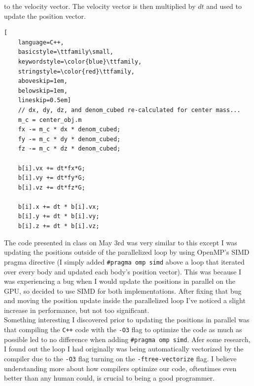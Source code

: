 to the velocity vector. The velocity vector is then multiplied by $dt$ and used to update the position vector.
\begin{lstlisting}[
    language=C++,
    basicstyle=\ttfamily\small,
    keywordstyle=\color{blue}\ttfamily,
    stringstyle=\color{red}\ttfamily,
    aboveskip=1em,
    belowskip=1em,
    lineskip=0.5em]
    // dx, dy, dz, and denom_cubed re-calculated for center mass...
    m_c = center_obj.m
    fx -= m_c * dx * denom_cubed; 
    fy -= m_c * dy * denom_cubed; 
    fz -= m_c * dz * denom_cubed;

    b[i].vx += dt*fx*G;
    b[i].vy += dt*fy*G;
    b[i].vz += dt*fz*G;

    b[i].x += dt * b[i].vx;
    b[i].y += dt * b[i].vy;
    b[i].z += dt * b[i].vz;
\end{lstlisting}
\indent The code presented in class on May 3rd was very similar to this except I was updating the positions outside of the 
parallelized loop by using OpenMP's SIMD pragma directive (I simply added \verb|#pragma omp simd| above a 
loop that iterated over every body and updated each body's position vector). This was because I was experiencing a bug 
when I would update the positions in parallel on the GPU, so decided to use SIMD for both implementations. After fixing that bug 
and moving the position update inside the parallelized loop
I've noticed a slight increase in performance, but not too significant. \\
\indent Something interesting I discovered prior to updating the positions in parallel 
was that compiling the \verb|C++| code with the \verb|-O3| flag to 
optimize the code as much as possible led to no difference when adding \verb|#pragma omp simd|. 
Afer some research, I found out the loop I had originally was being automatically vectorized by the compiler due to the \verb|-O3| 
flag turning on the \verb|-ftree-vectorize| flag. I believe understanding more about how compilers optimize our 
code, oftentimes even better than any human could, is crucial to being a good programmer.\\

